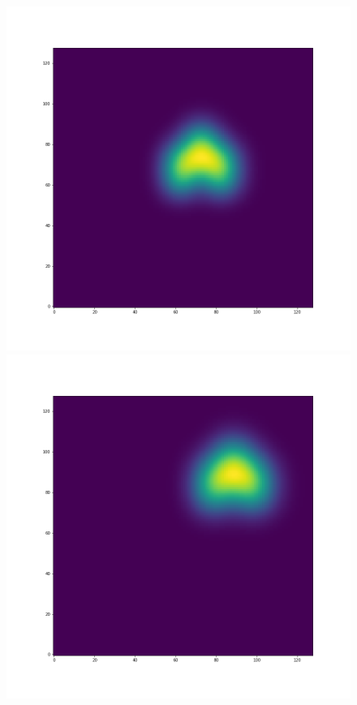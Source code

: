 \documentclass[12pt,a4paper]{article}
\begin{document}
\begin{figure}[H]
\centering
\begin{minipage}{.3\textwidth}
  \centering
  \includegraphics[width=\linewidth]{Pictures/Solve2DWhiteBearMovementTestGodunov/Solve2DWhiteBearMovementTest_t30.png}
\end{minipage}%
\begin{minipage}{.3\textwidth}
  \centering
  \includegraphics[width=\linewidth]{Pictures/Solve2DWhiteBearMovementTestGodunov/Solve2DWhiteBearMovementTest_t40.png}

\end{minipage}
\end{figure}
\end{document}
